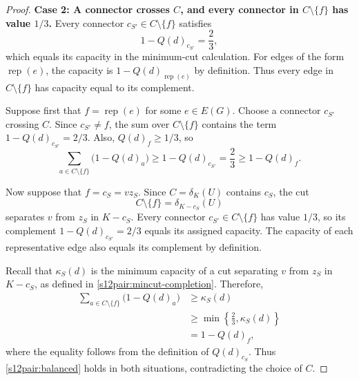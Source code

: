 \documentclass[11pt]{amsart}
\newcommand{\rep}[1]{\operatorname{rep}(#1)}
\newcommand{\1}{\mathbbm{1}}
\begin{document}
\begin{proof}
\smallskip\noindent
\textbf{Case 2: A connector crosses $C$, and every connector in
$C\setminus\{f\}$ has value $1/3$.}
Every connector $c_{S'}\in C\setminus\{f\}$ satisfies
\[
 1-{Q(d)}_{c_{S'}}=\frac23,
\]
which equals its capacity in the minimum-cut calculation.
For edges of the form $\rep{e}$, the capacity is
$1-{Q(d)}_{\rep{e}}$ by definition. Thus every edge in
$C\setminus\{f\}$ has capacity equal to its complement.

Suppose first that $f=\rep{e}$ for some $e\in E(G)$.
Choose a connector $c_{S'}$ crossing $C$. Since
$c_{S'}\ne f$, the sum over $C\setminus\{f\}$ contains
the term $1-{Q(d)}_{c_{S'}}=2/3$. Also, ${Q(d)}_f\ge1/3$,
so
\[
 \sum_{a\in C\setminus\{f\}}\bigl(1-{Q(d)}_a\bigr)
 \ge1-{Q(d)}_{c_{S'}}
 =\frac23
 \ge1-{Q(d)}_f.
\]

Now suppose that $f=c_S=vz_S$. Since $C=\delta_K(U)$
contains $c_S$, the cut
\[
 C\setminus\{f\}=\delta_{K-c_S}(U)
\]
separates $v$ from $z_S$ in $K-c_S$.
Every connector $c_{S'}\in C\setminus\{f\}$ has value
$1/3$, so its complement $1-{Q(d)}_{c_{S'}}=2/3$ equals
its assigned capacity. The capacity of each representative
edge also equals its complement by definition.

Recall that $\kappa_S(d)$ is the minimum capacity of a cut
separating $v$ from $z_S$ in $K-c_S$, as defined in
\eqref{s12pair:mincut-completion}. Therefore,
\[
 \begin{aligned}
 \sum_{a\in C\setminus\{f\}}\bigl(1-{Q(d)}_a\bigr)
 &\ge\kappa_S(d)\\
 &\ge\min\left\{\frac23,\kappa_S(d)\right\}\\
 &=1-{Q(d)}_f,
 \end{aligned}
\]
where the equality follows from the definition of
${Q(d)}_{c_S}$. Thus \eqref{s12pair:balanced} holds in both
situations, contradicting the choice of $C$.


\end{proof}
\end{document}
